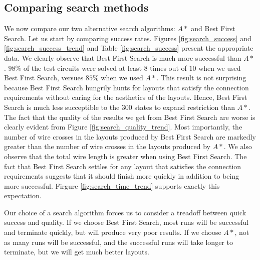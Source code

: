\subsection{Comparing search methods}

We now compare our two alternative search algorithms: $A*$ and Best First Search.
Let us start by comparing success rates. Figures \ref{fig:search_success} and
\ref{fig:search_success_trend} and Table \ref{fig:search_success} present the
appropriate data. We clearly observe that Best First Search is much more
successful than $A*$. $98\%$ of the test circuits were solved at least $8$ times
out of $10$ when we used Best First Search, versues $85\%$ when we used $A*$.
This result is not surprising because Best First Search hungrily hunts for
layouts that satisfy the connection requirements without caring for the
aesthetics of the layouts. Hence, Best First Search is much less succeptible to
the $300$ states to expand restriction than $A*$. The fact that the quality of
the results we get from Best First Search are worse
is clearly evident from Figure \ref{fig:search_quality_trend}. Most importantly, the
number of wire crosses in the layouts produced by Best First Search are markedly
greater than the number of wire crosses in the layouts produced by $A*$. We also
observe that the total wire length is greater when using Best First Search. The
fact that Best First Search settles for any layout that satisfies the connection
requirements suggests that it should finish more quickly in addition to being
more successful. Firgure \ref{fig:search_time_trend} supports exactly this
expectation.

Our choice of a search algorithm forces us to consider a treadoff between quick
success and quality. If we choose Best First Search, most runs will be successful
and terminate quickly, but will produce very poor results. If we choose $A*$,
not as many runs will be successful, and the successful runs will take longer to
terminate, but we will get much better layouts.

